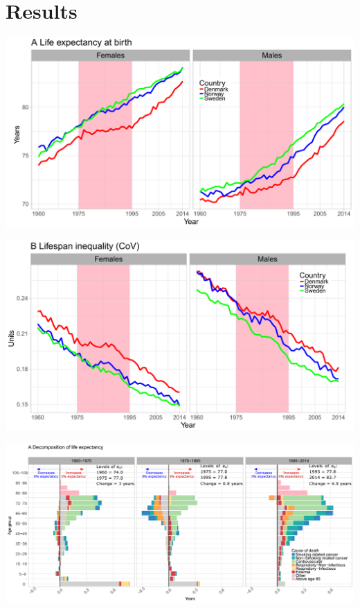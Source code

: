 \documentclass[xcolor={dvipsnames}]{beamer}
\begin{document}
\section{Results}



\begin{frame}
\hspace*{-.4in}
		\includegraphics[scale=.53]{Figures/Figure_0}	
\end{frame}


\begin{frame}
\hspace*{-.35in}
		\includegraphics[scale=.53]{Figures/Figure_1_2}	
\end{frame}

\begin{frame}
\hspace*{-.4in}
		\includegraphics[scale=.41]{Figures/Figure_2_1}	
\end{frame}
\end{document}
